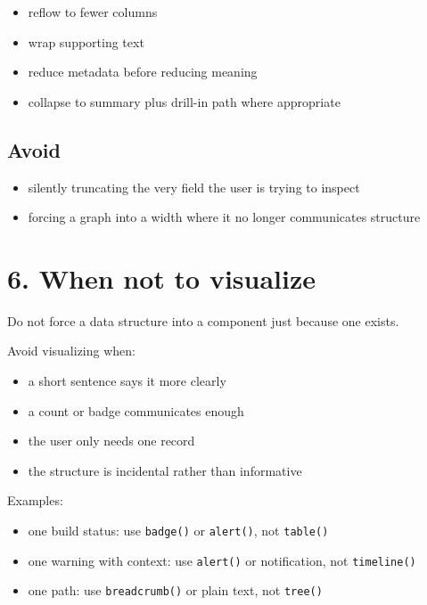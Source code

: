 \begin{itemize}
\tightlist
\item
  reflow to fewer columns
\item
  wrap supporting text
\item
  reduce metadata before reducing meaning
\item
  collapse to summary plus drill-in path where appropriate
\end{itemize}

\subsection{Avoid}\label{record-020-avoid}

\begin{itemize}
\tightlist
\item
  silently truncating the very field the user is trying to inspect
\item
  forcing a graph into a width where it no longer communicates structure
\end{itemize}

\section{6. When not to visualize}\label{record-020-when-not-to-visualize}

Do not force a data structure into a component just because one exists.

Avoid visualizing when:

\begin{itemize}
\tightlist
\item
  a short sentence says it more clearly
\item
  a count or badge communicates enough
\item
  the user only needs one record
\item
  the structure is incidental rather than informative
\end{itemize}

Examples:

\begin{itemize}
\tightlist
\item
  one build status: use \texttt{b\allowbreak{}a\allowbreak{}d\allowbreak{}g\allowbreak{}e\allowbreak{}(\allowbreak{})} or \texttt{a\allowbreak{}l\allowbreak{}e\allowbreak{}r\allowbreak{}t\allowbreak{}(\allowbreak{})}, not \texttt{t\allowbreak{}a\allowbreak{}b\allowbreak{}l\allowbreak{}e\allowbreak{}(\allowbreak{})}
\item
  one warning with context: use \texttt{a\allowbreak{}l\allowbreak{}e\allowbreak{}r\allowbreak{}t\allowbreak{}(\allowbreak{})} or notification, not \texttt{t\allowbreak{}i\allowbreak{}m\allowbreak{}e\allowbreak{}l\allowbreak{}i\allowbreak{}n\allowbreak{}e\allowbreak{}(\allowbreak{})}
\item
  one path: use \texttt{b\allowbreak{}r\allowbreak{}e\allowbreak{}a\allowbreak{}d\allowbreak{}c\allowbreak{}r\allowbreak{}u\allowbreak{}m\allowbreak{}b\allowbreak{}(\allowbreak{})} or plain text, not \texttt{t\allowbreak{}r\allowbreak{}e\allowbreak{}e\allowbreak{}(\allowbreak{})}
\end{itemize}

